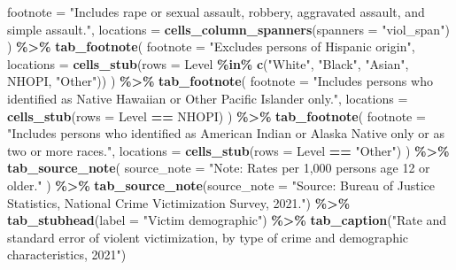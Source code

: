 \documentclass[
]{krantz}
\makeatletter
\newenvironment{Shaded}{\begin{snugshade}}{\end{snugshade}}
\newcommand{\AttributeTok}[1]{\textcolor[rgb]{0.27,0.27,0.27}{#1}}
\newcommand{\FunctionTok}[1]{\textcolor[rgb]{0.27,0.27,0.27}{\textbf{#1}}}
\newcommand{\NormalTok}[1]{#1}
\newcommand{\SpecialCharTok}[1]{\textcolor[rgb]{0.43,0.43,0.43}{\textbf{#1}}}
\newcommand{\StringTok}[1]{\textcolor[rgb]{0.5,0.5,0.5}{#1}}
\newenvironment{kframe}{%
\medskip{}
\setlength{\fboxsep}{.8em}
 \def\at@end@of@kframe{}%
 \ifinner\ifhmode%
  \def\at@end@of@kframe{\end{minipage}}%
  \begin{minipage}{\columnwidth}%
 \fi\fi%
 \def\FrameCommand##1{\hskip\@totalleftmargin \hskip-\fboxsep
 \colorbox{shadecolor}{##1}\hskip-\fboxsep
     \hskip-\linewidth \hskip-\@totalleftmargin \hskip\columnwidth}%
 \MakeFramed {\advance\hsize-\width
   \@totalleftmargin\z@ \linewidth\hsize
   \@setminipage}}%
 {\par\unskip\endMakeFramed%
 \at@end@of@kframe}
\renewenvironment{Shaded}{\begin{kframe}}{\end{kframe}}
\makeatother
\begin{document}
\begin{Shaded}
\begin{Highlighting}[]
    \AttributeTok{footnote =} \StringTok{"Includes rape or sexual assault, robbery,}
\StringTok{    aggravated assault, and simple assault."}\NormalTok{,}
    \AttributeTok{locations =} \FunctionTok{cells\_column\_spanners}\NormalTok{(}\AttributeTok{spanners =} \StringTok{"viol\_span"}\NormalTok{)}
\NormalTok{  ) }\SpecialCharTok{\%\textgreater{}\%}
  \FunctionTok{tab\_footnote}\NormalTok{(}
    \AttributeTok{footnote =} \StringTok{"Excludes persons of Hispanic origin"}\NormalTok{,}
    \AttributeTok{locations =}
      \FunctionTok{cells\_stub}\NormalTok{(}\AttributeTok{rows =}\NormalTok{ Level }\SpecialCharTok{\%in\%}
        \FunctionTok{c}\NormalTok{(}\StringTok{"White"}\NormalTok{, }\StringTok{"Black"}\NormalTok{, }\StringTok{"Asian"}\NormalTok{, NHOPI, }\StringTok{"Other"}\NormalTok{))}
\NormalTok{  ) }\SpecialCharTok{\%\textgreater{}\%}
  \FunctionTok{tab\_footnote}\NormalTok{(}
    \AttributeTok{footnote =} \StringTok{"Includes persons who identified as}
\StringTok{    Native Hawaiian or Other Pacific Islander only."}\NormalTok{,}
    \AttributeTok{locations =} \FunctionTok{cells\_stub}\NormalTok{(}\AttributeTok{rows =}\NormalTok{ Level }\SpecialCharTok{==}\NormalTok{ NHOPI)}
\NormalTok{  ) }\SpecialCharTok{\%\textgreater{}\%}
  \FunctionTok{tab\_footnote}\NormalTok{(}
    \AttributeTok{footnote =} \StringTok{"Includes persons who identified as American Indian or}
\StringTok{    Alaska Native only or as two or more races."}\NormalTok{,}
    \AttributeTok{locations =} \FunctionTok{cells\_stub}\NormalTok{(}\AttributeTok{rows =}\NormalTok{ Level }\SpecialCharTok{==} \StringTok{"Other"}\NormalTok{)}
\NormalTok{  ) }\SpecialCharTok{\%\textgreater{}\%}
  \FunctionTok{tab\_source\_note}\NormalTok{(}
    \AttributeTok{source\_note =} \StringTok{"Note: Rates per 1,000 persons age 12 or older."}
\NormalTok{  ) }\SpecialCharTok{\%\textgreater{}\%}
  \FunctionTok{tab\_source\_note}\NormalTok{(}\AttributeTok{source\_note =} \StringTok{"Source: Bureau of Justice Statistics,}
\StringTok{                  National Crime Victimization Survey, 2021."}\NormalTok{) }\SpecialCharTok{\%\textgreater{}\%}
  \FunctionTok{tab\_stubhead}\NormalTok{(}\AttributeTok{label =} \StringTok{"Victim demographic"}\NormalTok{) }\SpecialCharTok{\%\textgreater{}\%}
  \FunctionTok{tab\_caption}\NormalTok{(}\StringTok{"Rate and standard error of violent victimization,}
\StringTok{             by type of crime and demographic characteristics, 2021"}\NormalTok{)}
\end{Highlighting}
\end{Shaded}
\end{document}
